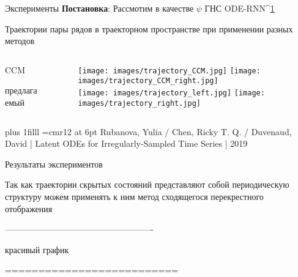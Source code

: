 \documentclass{beamer}
\newcommand{\btVFill}{\vskip0pt plus 1filll}
\begin{document}
	\begin{frame}{Эксперименты}
		\textbf{Постановка}: Рассмотим в качестве $\psi$ ГНС ODE-RNN^{\hyperref[paper]{1}}
		
		Траектории пары рядов в траекторном пространстве при применении разных методов
		
		\begin{columns}
			\begin{column}{0.1\textwidth}
				
				CCM
				\newline
				\newline
				\newline
				
				
				предлагаемый
				
			\end{column}
			
			\begin{column}{0.8\textwidth}
				
				\begin{figure}
					\texttt{[image: images/trajectory\_CCM.jpg]}
					\texttt{[image: images/trajectory\_CCM\_right.jpg]}  
					\\[\smallskipamount]
					\texttt{[image: images/trajectory\_left.jpg]}
					\texttt{[image: images/trajectory\_right.jpg]}
				\end{figure}
				
			\end{column}
		\end{columns} 
		
		
		\btVFill
		\hline
		\font\myfont=cmr12 at 6pt
		\label{paper}
		\myfont Rubanova, Yulia / Chen, Ricky T. Q. / Duvenaud, David | Latent ODEs for Irregularly-Sampled Time Series | 2019
	\end{frame}
	
	
	
	\begin{frame}{Результаты экспериментов}
		
		Так как траектории скрытых состояний представляют собой периодическую структуру можем применять к ним метод сходящегося перекрестного отображения
		
		
		----------------------------------------------------
		
		красивый график
		
		==========================
	\end{frame}
	
\end{document}
